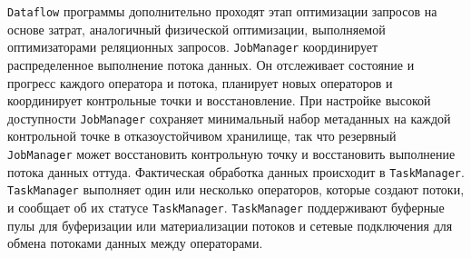 \texttt{Dataflow} программы дополнительно проходят этап оптимизации запросов на основе затрат, аналогичный физической оптимизации, выполняемой оптимизаторами реляционных запросов.
\texttt{JobManager} координирует распределенное выполнение потока данных. 
Он отслеживает состояние и прогресс каждого оператора и потока, планирует новых операторов и координирует контрольные точки и восстановление.
При настройке высокой доступности \texttt{JobManager} сохраняет минимальный набор метаданных на каждой контрольной точке в отказоустойчивом хранилище, так что резервный \texttt{JobManager} может восстановить контрольную точку и восстановить выполнение потока данных оттуда. 
Фактическая обработка данных происходит в \texttt{TaskManager}.
\texttt{TaskManager} выполняет один или несколько операторов, которые создают потоки, и сообщает об их статусе \texttt{TaskManager}. 
\texttt{TaskManager} поддерживают буферные пулы для буферизации или материализации потоков и сетевые подключения для обмена потоками данных между операторами.

